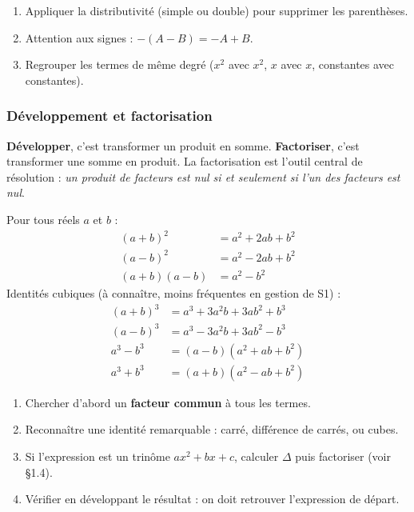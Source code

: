 \documentclass[12pt,a4paper]{article}
\begin{document}
\begin{methodebox}
\begin{enumerate}[leftmargin=1.3cm]
  \item Appliquer la distributivité (simple ou double) pour supprimer les parenthèses.
  \item Attention aux signes : $-(A-B) = -A+B$.
  \item Regrouper les termes de même degré ($x^2$ avec $x^2$, $x$ avec $x$, constantes avec constantes).
\end{enumerate}
\end{methodebox}

\subsubsection{Développement et factorisation}

\textbf{Développer}, c'est transformer un produit en somme. \textbf{Factoriser}, c'est transformer une somme en produit. La factorisation est l'outil central de résolution : \emph{un produit de facteurs est nul si et seulement si l'un des facteurs est nul}.

\begin{propbox}
Pour tous réels $a$ et $b$ :
\begin{align}
(a+b)^2 &= a^2 + 2ab + b^2 \\
(a-b)^2 &= a^2 - 2ab + b^2 \\
(a+b)(a-b) &= a^2 - b^2
\end{align}
Identités cubiques (à connaître, moins fréquentes en gestion de S1) :
\begin{align}
(a+b)^3 &= a^3 + 3a^2b + 3ab^2 + b^3 \\
(a-b)^3 &= a^3 - 3a^2b + 3ab^2 - b^3 \\
a^3-b^3 &= (a-b)(a^2+ab+b^2) \\
a^3+b^3 &= (a+b)(a^2-ab+b^2)
\end{align}
\end{propbox}

\begin{methodebox}
\begin{enumerate}[leftmargin=1.3cm]
  \item Chercher d'abord un \textbf{facteur commun} à tous les termes.
  \item Reconnaître une identité remarquable : carré, différence de carrés, ou cubes.
  \item Si l'expression est un trinôme $ax^2+bx+c$, calculer $\Delta$ puis factoriser (voir \S1.4).
  \item Vérifier en développant le résultat : on doit retrouver l'expression de départ.
\end{enumerate}
\end{methodebox}
\end{document}
